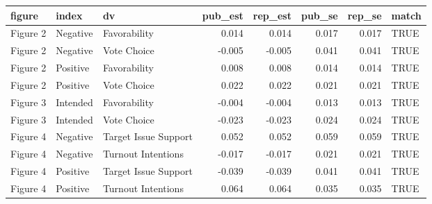 \begin{table}[ht]
\centering
\begin{tabular}{lllrrrrl}
  \hline
figure & index & dv & pub\_est & rep\_est & pub\_se & rep\_se & match \\ 
  \hline
Figure 2 & Negative & Favorability & 0.014 & 0.014 & 0.017 & 0.017 & TRUE \\ 
  Figure 2 & Negative & Vote Choice & -0.005 & -0.005 & 0.041 & 0.041 & TRUE \\ 
  Figure 2 & Positive & Favorability & 0.008 & 0.008 & 0.014 & 0.014 & TRUE \\ 
  Figure 2 & Positive & Vote Choice & 0.022 & 0.022 & 0.021 & 0.021 & TRUE \\ 
  Figure 3 & Intended & Favorability & -0.004 & -0.004 & 0.013 & 0.013 & TRUE \\ 
  Figure 3 & Intended & Vote Choice & -0.023 & -0.023 & 0.024 & 0.024 & TRUE \\ 
  Figure 4 & Negative & Target Issue Support & 0.052 & 0.052 & 0.059 & 0.059 & TRUE \\ 
  Figure 4 & Negative & Turnout Intentions & -0.017 & -0.017 & 0.021 & 0.021 & TRUE \\ 
  Figure 4 & Positive & Target Issue Support & -0.039 & -0.039 & 0.041 & 0.041 & TRUE \\ 
  Figure 4 & Positive & Turnout Intentions & 0.064 & 0.064 & 0.035 & 0.035 & TRUE \\ 
   \hline
\end{tabular}
\end{table}
